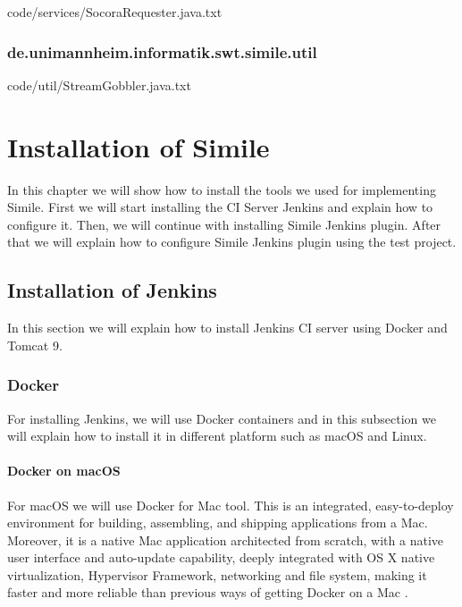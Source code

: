 
{code/services/SocoraRequester.java.txt}
\subsection{de.unimannheim.informatik.swt.simile.util}

{code/util/StreamGobbler.java.txt}

\chapter{Installation of Simile}
In this chapter we will show how to install the tools we used for implementing Simile. First we will start installing the CI Server Jenkins and explain how to configure it. Then, we will continue with installing Simile Jenkins plugin. After that we will explain how to configure Simile Jenkins plugin using the test project.

\section{Installation of Jenkins}
In this section we will explain how to install Jenkins CI server using Docker and Tomcat 9.

\subsection{Docker}
For installing Jenkins, we will use Docker containers and in this subsection we will explain how to install it in different platform such as macOS and Linux.

\subsubsection{Docker on macOS}
For macOS we will use Docker for Mac tool. This is an integrated, easy-to-deploy environment for building, assembling, and shipping applications from a Mac. Moreover, it is a native Mac application architected from scratch, with a native user interface and auto-update capability, deeply integrated with OS X native virtualization, Hypervisor Framework, networking and file system, making it faster and more reliable than previous ways of getting Docker on a Mac \cite{Docker}.

